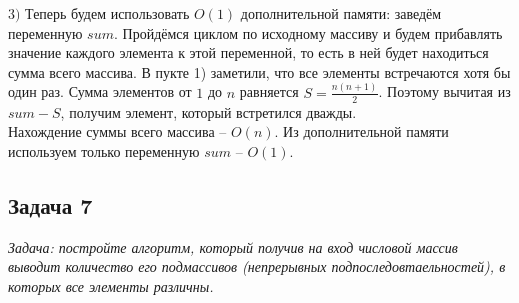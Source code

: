 \documentclass[a4paper,12pt]{article} %
\begin{document}
$ 3) $ Теперь будем использовать $O(1)$ дополнительной памяти: заведём переменную $ sum $. Пройдёмся циклом по исходному массиву и будем прибавлять значение каждого элемента к этой переменной, то есть в ней будет находиться сумма всего массива. В пукте 1) заметили, что все элементы встречаются хотя бы один раз. Сумма элементов от $1$ до $n$ равняется $S = \frac{n(n+1)}{2} $. Поэтому вычитая из $ sum - S $, получим элемент, который встретился дважды.\\
Нахождение суммы всего массива -- $O(n)$. Из дополнительной памяти используем только переменную $ sum $ -- $O(1)$.

\subsection*{Задача 7}
\textit{Задача: постройте алгоритм, который получив на вход числовой массив выводит количество его подмассивов (непрерывных подпоследовтаельностей), в которых все элементы различны.}
\end{document}
